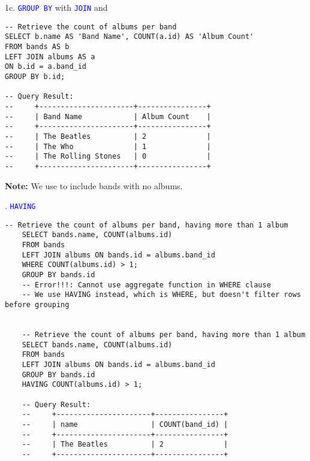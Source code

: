 \newpage

\noindent
1c. \textcolor{blue}{\texttt{GROUP BY}} with \textcolor{blue}{\texttt{JOIN}} and 
\begin{lstlisting}[style=sql]
-- Retrieve the count of albums per band
SELECT b.name AS 'Band Name', COUNT(a.id) AS 'Album Count'
FROM bands AS b
LEFT JOIN albums AS a 
ON b.id = a.band_id
GROUP BY b.id;

-- Query Result:
--     +----------------------+----------------+
--     | Band Name            | Album Count    |
--     +----------------------+----------------+
--     | The Beatles          | 2              |
--     | The Who              | 1              |
--     | The Rolling Stones   | 0              |
--     +----------------------+----------------+
\end{lstlisting}

\begin{Note}
    \textbf{Note:} We use  to include bands with no albums.
\end{Note}

. \textcolor{blue}{\texttt{HAVING}}

\begin{lstlisting}[style=sql]
    -- Retrieve the count of albums per band, having more than 1 album
    SELECT bands.name, COUNT(albums.id)
    FROM bands
    LEFT JOIN albums ON bands.id = albums.band_id
    WHERE COUNT(albums.id) > 1;
    GROUP BY bands.id
    -- Error!!!: Cannot use aggregate function in WHERE clause
    -- We use HAVING instead, which is WHERE, but doesn't filter rows before grouping


    -- Retrieve the count of albums per band, having more than 1 album
    SELECT bands.name, COUNT(albums.id)
    FROM bands
    LEFT JOIN albums ON bands.id = albums.band_id
    GROUP BY bands.id
    HAVING COUNT(albums.id) > 1;

    -- Query Result:
    --     +----------------------+----------------+
    --     | name                 | COUNT(band_id) |
    --     +----------------------+----------------+
    --     | The Beatles          | 2              |
    --     +----------------------+----------------+
\end{lstlisting}